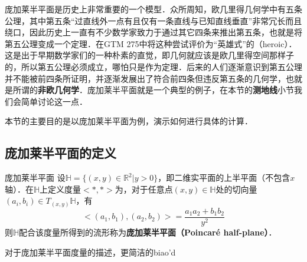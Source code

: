 
庞加莱半平面是历史上非常重要的一个模型．众所周知，欧几里得几何学中有五条公理，其中第五条“过直线外一点有且仅有一条直线与已知直线垂直”非常冗长而且绕口，因此历史上一直有不少数学家致力于通过其它四条来推出第五条，也就是将第五公理变成一个定理．在GTM 275\cite{GTM275}中将这种尝试评价为“英雄式”的（heroic）．这是出于早期数学家们的一种朴素的直觉，即几何就应该是欧几里得空间那样子的，所以第五公理必须成立，哪怕只是作为定理．后来的人们逐渐意识到第五公理并不能被前四条所证明，并逐渐发展出了符合前四条但违反第五条的几何学，也就是所谓的\textbf{非欧几何学}．庞加莱半平面就是一个典型的例子，在本节的\textbf{测地线}小节我们会简单讨论这一点．

本节的主要目的是以庞加莱半平面为例，演示如何进行具体的计算．

\subsection{庞加莱半平面的定义}

\begin{definition}{庞加莱半平面}
设$\mathbb{H}=\{(x, y)\in \mathbb{R}^2|y>0\}$，即二维实平面的上半平面（不包含$x$轴）．在$\mathbb{H}$上定义度量$<*,*>$为，对于任意点$(x, y)\in \mathbb{H}$处的切向量$(a_i, b_i)\in T_{(x, y)}\mathbb{H}$，有
\begin{equation}
<(a_1, b_1), (a_2, b_2)>=\frac{a_1a_2+b_1b_2}{y^2}
\end{equation}
则$\mathbb{H}$配合该度量所得到的流形称为\textbf{庞加莱半平面（Poincaré half-plane）}．
\end{definition}

对于庞加莱半平面度量的描述，更简洁的biao'd






















